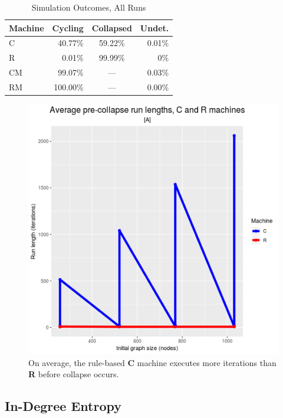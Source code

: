 \documentclass[twoside,twocolumn]{article}
\begin{document}
\begin{table}
\caption{Simulation Outcomes, All Runs}
\centering
\begin{tabular}{lrcr}
\toprule
Machine & Cycling & Collapsed & Undet. \\
\midrule
C & 40.77\% & 59.22\% & 0.01\% \\
R & 0.01\% & 99.99\% & 0\% \\
\cmidrule(r){2-3}
CM & 99.07\% & --- & 0.03\% \\
RM & 100.00\% & --- & 0.00\% \\
\bottomrule
\end{tabular}
\label{tab:Tab1}
\end{table}

\begin{figure}
  \includegraphics[width=\linewidth, scale=0.7]{figA.png}
  \caption{On average, the rule-based \textbf{C} machine executes more iterations than \textbf{R} before collapse occurs.}
  \label{fig:figA}
\end{figure}

\subsection{In-Degree Entropy}
\end{document}

